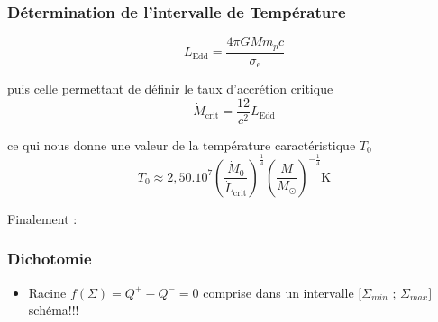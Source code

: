 \documentclass[french]{beamer}
\begin{document}
\begin{frame}
\frametitle{Détermination de l'intervalle de Température} 

   \begin{equation}
      L_\mathrm{Edd} = \frac{4\pi GMm_pc}{\sigma_e}
   \end{equation}

   puis celle permettant de définir le taux d’accrétion critique 
   \begin{equation}
      \dot{M}_\mathrm{crit} = \frac{12}{c^2}L_\mathrm{Edd} 
   \end{equation}

   ce qui nous donne une valeur de la température caractéristique $T_0$
   \begin{equation}
      T_0 \approx 2,50.10^7\left(\frac{\dot{M}_0}{\dot{L}_\mathrm{crit}}\right)^{\frac{1}{4}}\left(\frac{M}{M_\odot}\right)^{-\frac{1}{4}} \mathrm{K}
   \end{equation}

   Finalement : %

\end{frame}


\begin{frame}
\frametitle{Dichotomie}

   \begin{itemize}
      \item Racine $f(\Sigma) = Q^+ - Q^- = 0$ comprise dans un intervalle $[\Sigma_{min}$ ; $\Sigma_{max}]$
      \\
      schéma!!!
   \end{itemize}
\end{frame}

\end{document}
